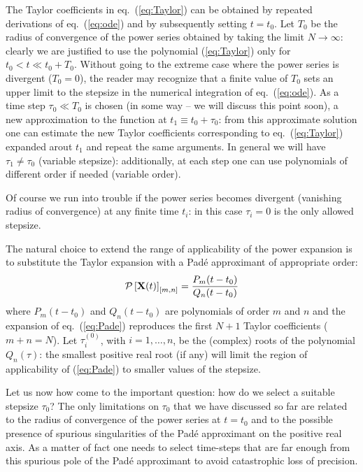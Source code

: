 \documentclass[final]{article}
\begin{document}
The Taylor coefficients in eq.~(\ref{eq:Taylor}) can be obtained by repeated derivations of eq.~(\ref{eq:ode}) and by subsequently setting $t=t_0$. Let $T_0$ be the radius of convergence of the power series obtained by taking the limit $N\rightarrow \infty$: clearly we are justified to use the polynomial (\ref{eq:Taylor}) only for $t_0 < t \ll t_0+T_0$. Without going to the extreme case where the power series is divergent ($T_0=0$), the reader may recognize that a finite value of $T_0$ sets an upper limit to the stepsize in the numerical integration of eq.~(\ref{eq:ode}).
As a time step $\tau_0 \ll T_0$ is chosen (in some way -- we will discuss this point soon), a new approximation to the function at $t_1 \equiv t_0 +\tau_0$: from this approximate solution one can estimate the new Taylor coefficients corresponding to eq.~(\ref{eq:Taylor}) expanded arout $t_1$ and repeat the same arguments. In general we will have $\tau_1 \neq \tau_0$ (variable stepsize): additionally, at each step one can use polynomials of different order if needed (variable order).


Of course we run into trouble if the power series becomes divergent (vanishing radius of convergence) at any finite time $t_i$: in this case $\tau_i = 0$ is the only allowed stepsize.

The natural choice to extend the range of applicability of the power expansion is to substitute the Taylor expansion
with a Pad\'e approximant of appropriate order:
\begin{equation}
\mathcal{P}\left[{\bf X}(t)\right]_{[m,n]} = \frac{P_m(t-t_0)}{Q_n(t-t_0)}
\label{eq:Pade}
\end{equation}
where $P_m(t-t_0)$ and $Q_n(t-t_0)$ are polynomials of order $m$ and $n$ and the expansion of eq.~(\ref{eq:Pade}) reproduces the first 
$N+1$ Taylor coefficients ($m+n=N$).
Let $\tau_i^{(0)}$, with $i=1,\dots,n$, be the (complex) roots of the polynomial $Q_n(\tau)$: the smallest positive real root (if any) will limit the region of applicability  of (\ref{eq:Pade}) to smaller values of the stepsize.

Let us now how come to the important question: how do we select a suitable stepsize $\tau_0$? The only limitations on $\tau_0$ that we have discussed so far are related to the radius of convergence of the power series at $t=t_0$ and to the possible presence of 
spurious singularities of the Pad\'e approximant on the positive real axis. As a matter of fact one needs to 
select time-steps that are far enough from this spurious pole of the Pad\'e approximant to  avoid catastrophic loss of precision. 
\end{document}
